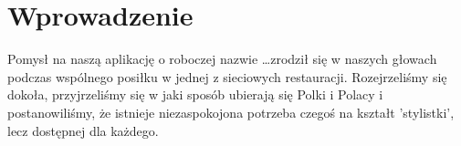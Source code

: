 \chapter{Wprowadzenie}

Pomysł na naszą aplikację o roboczej nazwie \dots zrodził się w naszych głowach podczas wspólnego posiłku w jednej z sieciowych restauracji. Rozejrzeliśmy się dokoła, przyjrzeliśmy się w jaki sposób ubierają się Polki i Polacy i postanowiliśmy, że istnieje niezaspokojona potrzeba czegoś na kształt 'stylistki', lecz dostępnej dla każdego. 